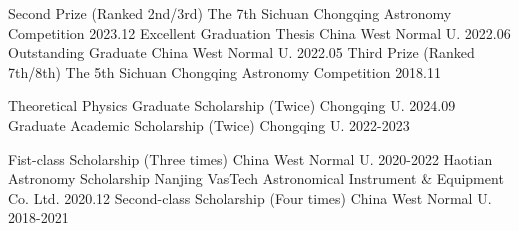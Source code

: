 

\begin{cvhonors}

  \cvhonor
    {Second Prize (Ranked 2nd/3rd)} %
    {The 7th Sichuan Chongqing Astronomy Competition} %
    {} %
    {2023.12} %
  \cvhonor
    {Excellent Graduation Thesis} %
    {China West Normal U.} %
    {} %
    {2022.06} %
  \cvhonor
    {Outstanding Graduate} %
    {China West Normal U.} %
    {} %
    {2022.05} %
  \cvhonor
    {Third Prize (Ranked 7th/8th)} %
    {The 5th Sichuan Chongqing Astronomy Competition} %
    {} %
    {2018.11} %

\end{cvhonors}


\begin{cvhonors}

  \cvhonor
    {Theoretical Physics Graduate Scholarship (Twice)} %
    {Chongqing U.} %
    {} %
    {2024.09} %
  \cvhonor
    {Graduate Academic Scholarship (Twice)} %
    {Chongqing U.} %
    {} %
    {2022-2023} %

  \cvhonor
    {Fist-class Scholarship (Three times)} %
    {China West Normal U.} %
    {} %
    {2020-2022} %
  \cvhonor
    {Haotian Astronomy Scholarship} %
    {Nanjing VasTech Astronomical Instrument \& Equipment Co. Ltd.} %
    {} %
    {2020.12} %
  \cvhonor
    {Second-class Scholarship (Four times)} %
    {China West Normal U.} %
    {} %
    {2018-2021} %
\end{cvhonors}
